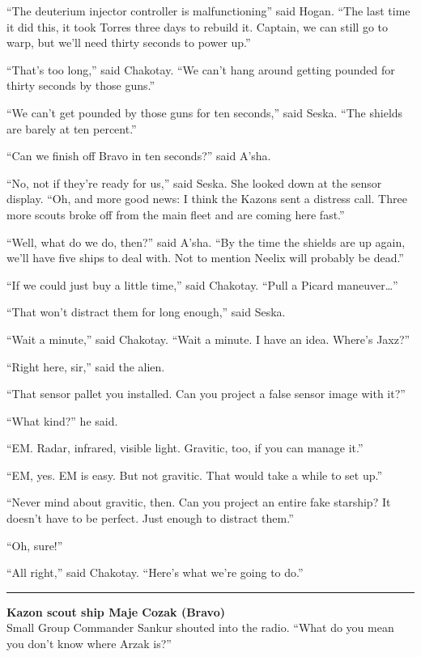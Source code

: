 \documentclass[twoside,letterpaper,12pt]{memoir}
\begin{document}
``The deuterium injector controller is malfunctioning'' said Hogan. ``The last time it did this, it took Torres three days to rebuild it. Captain, we can still go to warp, but we'll need thirty seconds to power up.''

``That's too long,'' said Chakotay. ``We can't hang around getting pounded for thirty seconds by those guns.''

``We can't get pounded by those guns for ten seconds,'' said Seska. ``The shields are barely at ten percent.''

``Can we finish off Bravo in ten seconds?'' said A'sha.

``No, not if they’re ready for us,'' said Seska. She looked down at the sensor display. ``Oh, and more good news: I think the Kazons sent a distress call. Three more scouts broke off from the main fleet and are coming here fast.''

``Well, what do we do, then?'' said A'sha. ``By the time the shields are up again, we'll have five ships to deal with. Not to mention Neelix will probably be dead.''

``If we could just buy a little time,'' said Chakotay. ``Pull a Picard maneuver\ldots ''

``That won't distract them for long enough,'' said Seska.

``Wait a minute,'' said Chakotay. ``Wait a minute. I have an idea. Where's Jaxz?''

``Right here, sir,'' said the alien.

``That sensor pallet you installed. Can you project a false sensor image with it?''

``What kind?'' he said.

``EM. Radar, infrared, visible light. Gravitic, too, if you can manage it.''

``EM, yes. EM is easy. But not gravitic. That would take a while to set up.''

``Never mind about gravitic, then. Can you project an entire fake starship? It doesn't have to be perfect. Just enough to distract them.''

``Oh, sure!''

``All right,'' said Chakotay. ``Here's what we're going to do.''

\fancybreak{\rule{3cm}{0.4 pt}}
\noindent\textbf{Kazon scout ship Maje Cozak (Bravo)}\\

Small Group Commander Sankur shouted into the radio. ``What do you mean you don't know where Arzak is?''
\end{document}
